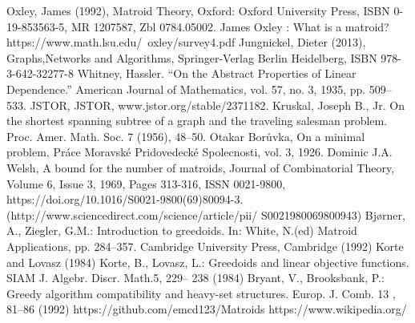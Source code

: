 \documentclass{article}
\theoremstyle{plain}
\theoremstyle{definition}
\theoremstyle{remark}
\begin{document}
\pagebreak

\begin{thebibliography}{}
    Oxley, James (1992), Matroid Theory, Oxford: Oxford University Press, ISBN 0-19-853563-5, MR 1207587, Zbl 0784.05002.
    James Oxley : What is a matroid? https://www.math.lsu.edu/~oxley/survey4.pdf
	Jungnickel, Dieter (2013), Graphs,Networks and Algorithms, Springer-Verlag Berlin Heidelberg, ISBN 978-3-642-32277-8 
	Whitney, Hassler. “On the Abstract Properties of Linear Dependence.” American Journal of Mathematics, vol. 57, no. 3, 1935, pp. 		509–533. JSTOR, JSTOR, www.jstor.org/stable/2371182.
	Kruskal, Joseph B., Jr. On the shortest spanning subtree of a graph and the traveling salesman problem. Proc. Amer. Math. Soc. 7 	(1956), 48–50. 
	Otakar Borůvka, On a minimal problem, Práce Moravské Pridovedecké Spolecnosti, vol. 3, 1926. 
	Dominic J.A. Welsh, A bound for the number of matroids, Journal of Combinatorial Theory, Volume 6, Issue 3, 1969, Pages 313-316, 	ISSN 0021-9800, https://doi.org/10.1016/S0021-9800(69)80094-3. (http://www.sciencedirect.com/science/article/pii/				S0021980069800943)
	Bjørner, A., Ziegler, G.M.: Introduction to greedoids. In: White, N.(ed) Matroid Applications, pp. 284–357. Cambridge University 	Press, Cambridge (1992)
	Korte and Lovasz (1984) Korte, B., Lovasz, L.: Greedoids and linear objective functions. SIAM J. Algebr. Discr. Math.5, 229– 			238 (1984)
	Bryant,  V.,  Brooksbank,  P.:  Greedy  algorithm  compatibility  and heavy-set structures. Europ. J. Comb. 13 , 81–86 (1992)
	https://github.com/emcd123/Matroids
	https://www.wikipedia.org/
\end{thebibliography}
\end{document}
